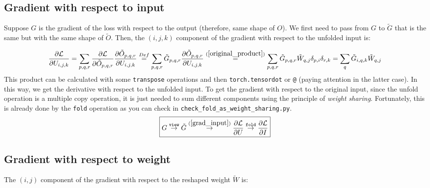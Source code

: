 \documentclass[11pt,titlepage]{article}
\begin{document}
\subsection{Gradient with respect to input}
Suppose $G$ is the gradient of the loss with respect to the output (therefore, same shape of $O$).  We first need to pass from $G$ to $\tilde{G}$ that is the same but with the same shape of $\tilde{O}$. Then, the $(i,j,k)$ component of the gradient with respect to the unfolded input is: 

\begin{equation} \label{grad_input}
	\frac{\partial \mathcal{L}}{\partial U_{i,j,k}} = \sum_{p,q,r} \frac{\partial \mathcal{L}}{\partial \tilde{O}_{p,q,r}} \frac{\partial \tilde{O}_{p,q,r}}{\partial U_{i,j,k}} \overset{Def }{=} \sum_{p,q,r} \tilde{G}_{p,q,r} \frac{\partial \tilde{O}_{p,q,r}}{\partial U_{i,j,k}} \overset{(\ref{original_product}) }{=} \sum_{p,q,r} \tilde{G}_{p,q,r} \tilde{W}_{q,j}\delta_{p,i} \delta_{r,k} = \sum_{q} \tilde{G}_{i,q,k} \tilde{W}_{q,j}
\end{equation}
This product can be calculated with some \texttt{transpose} operations and then \texttt{torch.tensordot} or \texttt{@} (paying attention in the latter case). In this way, we get the derivative with respect to the unfolded input. To get the gradient with respect to the original input, since the unfold operation is a multiple copy operation, it is just needed to sum different components using the principle of \emph{weight sharing}. Fortunately, this is already done by the \texttt{fold} operation as you can check in \texttt{check\_fold\_as\_weight\_sharing.py}. 
\begin{equation*}
	\boxed{G \overset{\texttt{view}}{\rightarrow} \tilde{G} \overset{(\ref{grad_input})}{\rightarrow} \frac{ \partial \mathcal{L}}{ \partial U} \overset{\texttt{fold}}{\rightarrow} \frac{ \partial \mathcal{L}}{ \partial I} }
\end{equation*}


\subsection{Gradient with respect to weight}
The $(i,j)$ component of the gradient with respect to the reshaped weight $\tilde{W}$ is: 
\end{document}
